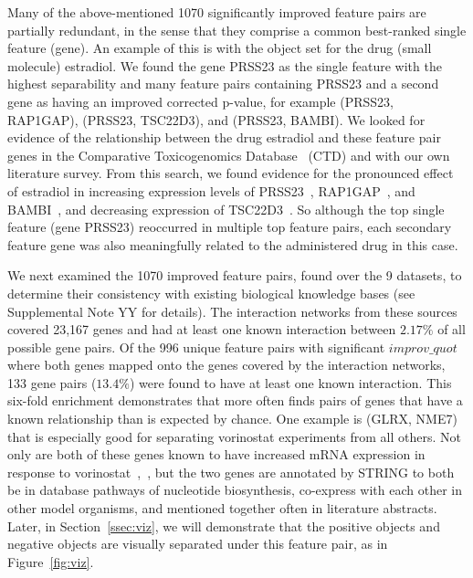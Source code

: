 Many of the above-mentioned 1070 significantly improved feature pairs are partially redundant, in the sense that they comprise a common best-ranked single feature (gene). An example of this is with the object set for the drug (small molecule) estradiol. We found the gene PRSS23 as the single feature with the highest separability and many feature pairs containing PRSS23 and a second gene as having an improved corrected p-value, for example (PRSS23, RAP1GAP), (PRSS23, TSC22D3), and (PRSS23, BAMBI). We looked for evidence of the relationship between the drug estradiol and these feature pair genes in the Comparative Toxicogenomics Database~\cite{grondin2018accessing} (CTD) and with our own literature survey. From this search, we found evidence for the pronounced effect of estradiol in increasing expression levels of PRSS23~\cite{chan2012serine}, RAP1GAP~\cite{moggs2004phenotypic}, and BAMBI~\cite{spink2009long}, and decreasing expression of TSC22D3~\cite{sengupta2013molecular}. So although the top single feature (gene PRSS23) reoccurred in multiple top feature pairs, each secondary feature gene was also meaningfully related to the administered drug in this case.

We next examined the 1070 improved feature pairs, found over the 9 \lincs datasets, to determine their consistency with existing biological knowledge bases (see Supplemental Note YY for details). The interaction networks from these sources covered 23,167 genes and had at least one known interaction between $2.17\%$ of all possible gene pairs. Of the 996 unique feature pairs with significant $improv\_quot$ where both genes mapped onto the genes covered by the interaction networks, 133 gene pairs ($13.4\%$) were found to have at least one known interaction. This six-fold enrichment demonstrates that \genviz more often finds pairs of genes that have a known relationship than is expected by chance. One example is (GLRX, NME7) that is especially good for separating vorinostat experiments from all others. Not only are both of these genes known to have increased mRNA expression in response to vorinostat~\cite{qi2014systematic},~\cite{soldi2013genomic}, but the two genes are annotated by STRING to both be in database pathways of nucleotide biosynthesis, co-express with each other in other model organisms, and mentioned together often in literature abstracts. Later, in Section~\ref{ssec:viz}, we will demonstrate that the positive objects and negative objects are visually separated under this feature pair, as in Figure~\ref{fig:viz}.

